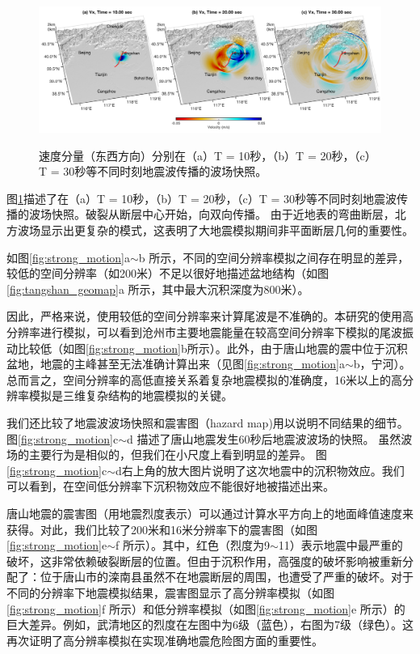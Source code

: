 \documentclass[degree=doctor]{thuthesis}
\begin{document}
\begin{figure}[h]
    \includegraphics[width=1.0\columnwidth]{Snap_Vx_tangshan.pdf}\\
    \caption{速度分量（东西方向）分别在（a）T = 10秒，（b）T = 20秒，（c）T = 30秒等不同时刻地震波传播的波场快照。}
    \label{fig:strong_motion_2}
\end{figure}

图\ref{fig:strong_motion_2}描述了在（a）T = 10秒，（b）T = 20秒，（c）T = 30秒等不同时刻地震波传播的波场快照。破裂从断层中心开始，向双向传播。 由于近地表的弯曲断层，北方波场显示出更复杂的模式，这表明了大地震模拟期间非平面断层几何的重要性。

如图\ref{fig:strong_motion}a$\sim$b 所示，不同的空间分辨率模拟之间存在明显的差异，较低的空间分辨率（如200米）不足以很好地描述盆地结构（如图\ref{fig:tangshan_geomap}a 所示，其中最大沉积深度为800米）。


因此，严格来说，使用较低的空间分辨率来计算尾波是不准确的。本研究的使用高分辨率进行模拟，可以看到沧州市主要地震能量在较高空间分辨率下模拟的尾波振动比较低（如图\ref{fig:strong_motion}b所示）。此外，由于唐山地震的震中位于沉积盆地，地震的主峰甚至无法准确计算出来（见图\ref{fig:strong_motion}a$\sim$b，宁河）。总而言之，空间分辨率的高低直接关系着复杂地震模拟的准确度，16米以上的高分辨率模拟是三维复杂结构的地震模拟的关键。

我们还比较了地震波波场快照和震害图（hazard map)用以说明不同结果的细节。 图\ref{fig:strong_motion}c$\sim$d 描述了唐山地震发生60秒后地震波波场的快照。 虽然波场的主要行为是相似的，但我们在小尺度上看到明显的差异。 图\ref{fig:strong_motion}c$\sim$d右上角的放大图片说明了这次地震中的沉积物效应。我们可以看到，在空间低分辨率下沉积物效应不能很好地被描述出来。

唐山地震的震害图（用地震烈度表示）可以通过计算水平方向上的地面峰值速度来获得。对此，我们比较了200米和16米分辨率下的震害图（如图\ref{fig:strong_motion}e$\sim$f 所示）。其中，红色（烈度为9$\sim$11）表示地震中最严重的破坏，这非常依赖破裂断层的位置。但由于沉积作用，高强度的破坏影响被重新分配了：位于唐山市的滦南县虽然不在地震断层的周围，也遭受了严重的破坏。对于不同的分辨率下地震模拟结果，震害图显示了高分辨率模拟（如图\ref{fig:strong_motion}f 所示）和低分辨率模拟（如图\ref{fig:strong_motion}e 所示）的巨大差异。例如，武清地区的烈度在左图中为6级（蓝色），右图为7级（绿色）。这再次证明了高分辨率模拟在实现准确地震危险图方面的重要性。
\end{document}
